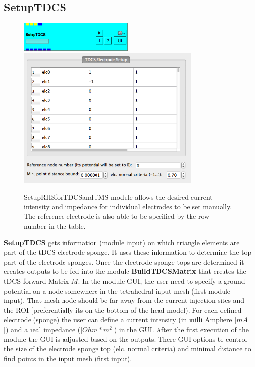 \documentclass[fleqn,11pt,openany]{book}
\newcommand{\imgSm}{0.5}
\begin{document}
\subsection{SetupTDCS}
\begin{figure}[H]
	\centering
	\includegraphics[width=\imgSm\textwidth]{BrainStimulation_figures/SetupTDCS.png}
	\includegraphics[width=0.8\textwidth]{BrainStimulation_figures/SetupTDCS_GUI.png}
	\caption{SetupRHSforTDCSandTMS module allows the desired current intensity and impedance for individual electrodes to be set manually. The reference electrode is also able to be specified by the row number in the table.}
	\label{fig:setup_rhs}
\end{figure}

\textbf{SetupTDCS} gets information (module input) on which triangle elements are part of the tDCS electrode sponge. It uses these information to
determine the top part of the electrode sponges. Once the electrode sponge tops are determined it creates outputs to be fed into the module
\textbf{BuildTDCSMatrix} that creates the tDCS forward Matrix $M$. In the module GUI, the user need to specify a ground potential on a node somewhere in
the tetrahedral input mesh (first module input). That mesh node should be far away from the current injection sites and the ROI (preferentially its on the bottom
of the head model). For each defined electrode (sponge) the user can define a current intensity (in milli Amphere [$mA$]) and a real impedance ([$Ohm * m^2$]) 
in the GUI. After the first execution of the module the GUI is adjusted based on the outputs. There GUI options to control the size of the electrode sponge top
(elc. normal criteria) and minimal distance to find points in the input mesh (first input).
\end{document}
